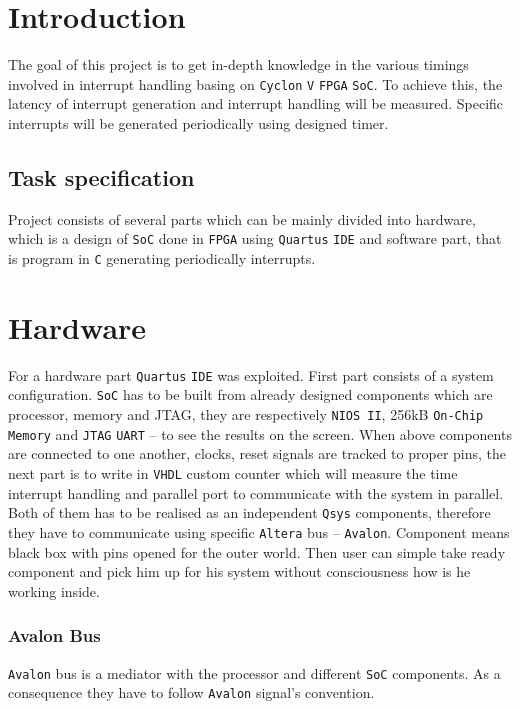 \chapter{Introduction}
The goal of this project is to get in-depth knowledge in the various timings involved in interrupt handling basing on \verb|Cyclon| \verb|V| \verb|FPGA| \verb|SoC|. To achieve this, the latency of interrupt generation and interrupt handling will be measured. Specific interrupts will be generated periodically using designed timer.  
\section{Task specification}
Project consists of several parts which can be mainly divided into hardware, which is a design of \verb|SoC| done in \verb|FPGA| using \verb|Quartus| \verb|IDE| and software part, that is program in \verb|C| generating periodically interrupts. 

\begingroup
\renewcommand{\cleardoublepage}{}
\renewcommand{\clearpage}{}
\chapter{Hardware}
\endgroup
For a hardware part \verb|Quartus| \verb|IDE| was exploited. First part consists of a system configuration. \verb|SoC| has to be built from already designed components which are processor, memory and JTAG, they are respectively \verb|NIOS II|, 256kB  \verb|On-Chip| \verb|Memory| and \verb|JTAG| \verb|UART| -- to see the results on the screen. When above components are connected to one another, clocks, reset signals are tracked to proper pins, the next part is to write in \verb|VHDL| custom counter which will measure the time interrupt handling and parallel port to communicate with the system in parallel. Both of them has to be realised as an independent \verb|Qsys| components, therefore they have to communicate using specific \verb|Altera| bus -- \verb|Avalon|. Component means black box with pins opened for the outer world. Then user can simple take ready component and pick him up for his system without consciousness how is he working inside. 

\subsection{Avalon Bus}
\verb|Avalon| bus is a mediator with the processor and different \verb|SoC| components. As a consequence they have to follow \verb|Avalon| signal's convention.

